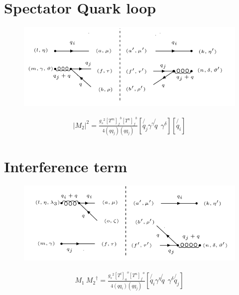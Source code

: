 \section{Spectator Quark loop}
\begin{figure}[ht!]
\centering
\includegraphics[scale=0.7]{images/QG/M2Squer.png}
\end{figure}

\begin{equation}
\begin{split}
|M_2|^2=\frac{{g_s}^2 {[T^m]_f}^b {[T^n]_{f}}^{b}}{4(qq_j)(qq_j)}[\not{q_j}{\gamma}^{\gamma}\not{q}\:\: {\gamma}^{{\delta}}][\not{q_i}]
\end{split}
\end{equation}

\pagebreak

\section{Interference term}
\begin{figure}[ht!]
\centering
\includegraphics[scale=0.7]{images/QG/M1M2Dagger.png}
\end{figure}


\begin{equation}
\begin{split}
M_1\: {M_2}^{\dagger}=\frac{{g_s}^2 {[T^l]_a}^o {[T^n]_{f}}^{o}}{4(qq_i)(qq_j)}[\not{q_i}{\gamma}^{\eta}\not{q}\:\: {\gamma}^{{\delta}}\not{q_j}]
\end{split}
\end{equation}
